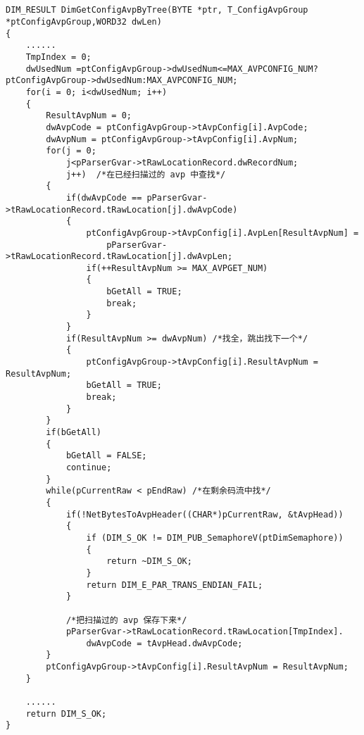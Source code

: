 ﻿\documentclass  [11pt,twocolumn]{article}
\begin{document}
\subsection{}
\begin{lstlisting}
DIM_RESULT DimGetConfigAvpByTree(BYTE *ptr, T_ConfigAvpGroup *ptConfigAvpGroup,WORD32 dwLen)
{
    ......
    TmpIndex = 0;
    dwUsedNum =ptConfigAvpGroup->dwUsedNum<=MAX_AVPCONFIG_NUM?ptConfigAvpGroup->dwUsedNum:MAX_AVPCONFIG_NUM;
    for(i = 0; i<dwUsedNum; i++)
    {
        ResultAvpNum = 0;
        dwAvpCode = ptConfigAvpGroup->tAvpConfig[i].AvpCode;
        dwAvpNum = ptConfigAvpGroup->tAvpConfig[i].AvpNum;
        for(j = 0; 
            j<pParserGvar->tRawLocationRecord.dwRecordNum;
            j++)  /*在已经扫描过的 avp 中查找*/
        {
            if(dwAvpCode == pParserGvar->tRawLocationRecord.tRawLocation[j].dwAvpCode)
            {
                ptConfigAvpGroup->tAvpConfig[i].AvpLen[ResultAvpNum] = 
                    pParserGvar->tRawLocationRecord.tRawLocation[j].dwAvpLen;
                if(++ResultAvpNum >= MAX_AVPGET_NUM)
                {
                    bGetAll = TRUE;
                    break;
                }
            }
            if(ResultAvpNum >= dwAvpNum) /*找全，跳出找下一个*/
            {
                ptConfigAvpGroup->tAvpConfig[i].ResultAvpNum = ResultAvpNum;
                bGetAll = TRUE;
                break;
            }
        }
        if(bGetAll)
        {
            bGetAll = FALSE;
            continue;
        }
        while(pCurrentRaw < pEndRaw) /*在剩余码流中找*/
        {
            if(!NetBytesToAvpHeader((CHAR*)pCurrentRaw, &tAvpHead))
            {
                if (DIM_S_OK != DIM_PUB_SemaphoreV(ptDimSemaphore))
                {
                    return ~DIM_S_OK;
                }  	
                return DIM_E_PAR_TRANS_ENDIAN_FAIL;
            }

            /*把扫描过的 avp 保存下来*/
		    pParserGvar->tRawLocationRecord.tRawLocation[TmpIndex].
                dwAvpCode = tAvpHead.dwAvpCode;
        }
        ptConfigAvpGroup->tAvpConfig[i].ResultAvpNum = ResultAvpNum; 
    }

    ......
    return DIM_S_OK;
} 
\end{lstlisting}
\end{document}

